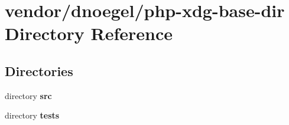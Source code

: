 \section{vendor/dnoegel/php-\/xdg-\/base-\/dir Directory Reference}
\label{dir_c3b4f87591df7e2bfad65fb86e8dfd0b}
\subsection*{Directories}
\begin{DoxyCompactItemize}
\item 
directory {\bf src}
\item 
directory {\bf tests}
\end{DoxyCompactItemize}
